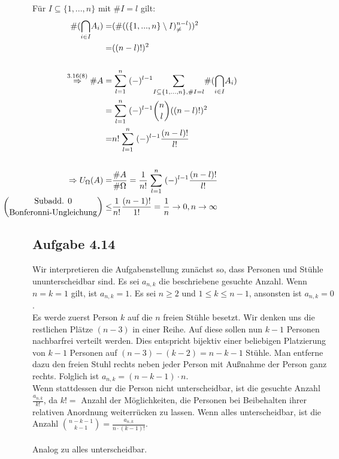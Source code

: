 \documentclass[10pt, a4paper]{article}
\begin{document}
Für $I\subseteq\{1,...,n \}$ mit $\#I=l$ gilt:
\begin{align*}
	\#(\underset{i\in I}{\bigcap}A_{i})=&(\#((\{1,...,n \}\setminus I)^{n-l}_{\neq}))^{2}	\hspace{120pt}\\
	=& ((n-l)!)^{2}
	\\	\\
	\stackrel{3.16(8)}{\Rightarrow}\#A=&\stackrel{n}{\underset{l=1}{\sum}}(-)^{l-1}\underset{I\subseteq\{1,...,n \},\#I=l}{\sum}\#(\underset{i\in I}{\bigcap}A_{i})	\\
	=& \stackrel{n}{\underset{l=1}{\sum}}(-)^{l-1}\binom{n}{l}((n-l)!)^{2}	\\
	=& n!\stackrel{n}{\underset{l=1}{\sum}}(-)^{l-1}\frac{(n-l)!}{l!}	\\
	\\
	\Rightarrow U_{\Omega}(A)=&\frac{\#A}{\#\Omega}=\frac{1}{n!}\stackrel{n}{\underset{l=1}{\sum}}(-)^{l-1}\frac{(n-l)!}{l!}	\\
	\hspace{-130pt}\binom{\text{Subadd. 0}}{\text{Bonferonni-Ungleichung}} \leq&\frac{1}{n!}\frac{(n-1)!}{1!}=\frac{1}{n}\rightarrow 0, n\rightarrow\infty
\end{align*}



\subsection{Aufgabe 4.14}
Wir interpretieren die Aufgabenstellung zunächst so, dass Personen und Stühle ununterscheidbar sind. Es sei $a_{n,k}$ die beschriebene gesuchte Anzahl. Wenn $n=k=1$ gilt, ist $a_{n,k}=1$. Es sei $n\geq2$ und $1\leq k\leq n-1$, ansonsten ist $a_{n,k}=0$. 	\\

Es werde zuerst Person $k$ auf die $n$ freien Stühle besetzt. Wir denken uns die restlichen Plätze $(n-3)$ in einer Reihe. Auf diese sollen nun $k-1$ Personen nachbarfrei verteilt werden. Dies entspricht bijektiv einer beliebigen Platzierung von $k-1$ Personen auf $(n-3)-(k-2)=n-k-1$ Stühle. Man entferne dazu den freien Stuhl rechts neben jeder Person mit Außnahme der Person ganz rechts. Folglich ist $a_{n,k}=(n-k-1)\cdot n$.	\\

Wenn stattdessen dur die Person nicht unterscheidbar, ist die gesuchte Anzahl $\frac{a_{n,k}}{k!}$, da $k!=$ Anzahl der Möglichkeiten, die Personen bei Beibehalten ihrer relativen Anordnung weiterrücken zu lassen. Wenn alles unterscheidbar, ist die Anzahl $\binom{n-k-1}{k-1}=\frac{a_{n,k}}{n\cdot(k-1)!}$.	\\	\\
Analog zu alles unterscheidbar.
\end{document}
